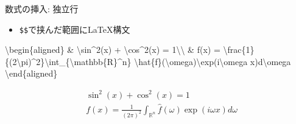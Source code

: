 \documentclass[
  14pt,
  ignorenonframetext,
]{beamer}
\newenvironment{Shaded}{\begin{snugshade}}{\end{snugshade}}
\newcommand{\SpecialCharTok}[1]{\textcolor[rgb]{0.00,0.00,0.00}{#1}}
\newcommand{\SpecialStringTok}[1]{\textcolor[rgb]{0.31,0.60,0.02}{#1}}
\providecommand{\tightlist}{%
  \setlength{\itemsep}{0pt}\setlength{\parskip}{0pt}}
\begin{document}
\begin{frame}[fragile]{数式の挿入: 独立行}
\protect\hypertarget{ux6570ux5f0fux306eux633fux5165-ux72ecux7acbux884c}{}

\begin{itemize}
\tightlist
\item
  \texttt{\$\$}で挟んだ範囲に\LaTeX 構文
\end{itemize}

\begin{Shaded}
\begin{Highlighting}[]
\SpecialStringTok{$$}\SpecialCharTok{\textbackslash{}begin}\SpecialStringTok{\{aligned\}}
\SpecialStringTok{& }\SpecialCharTok{\textbackslash{}sin}\SpecialStringTok{^2(x) + }\SpecialCharTok{\textbackslash{}cos}\SpecialStringTok{^2(x) = 1}\SpecialCharTok{\textbackslash{}\textbackslash{}}
\SpecialStringTok{& f(x) = }\SpecialCharTok{\textbackslash{}frac}\SpecialStringTok{\{1\}\{(2}\SpecialCharTok{\textbackslash{}pi}\SpecialStringTok{)^2\}}\SpecialCharTok{\textbackslash{}int}\SpecialStringTok{_\{}\SpecialCharTok{\textbackslash{}mathbb}\SpecialStringTok{\{R\}^n\}}
\SpecialCharTok{\textbackslash{}hat}\SpecialStringTok{\{f\}(}\SpecialCharTok{\textbackslash{}omega}\SpecialStringTok{)}\SpecialCharTok{\textbackslash{}exp}\SpecialStringTok{(i}\SpecialCharTok{\textbackslash{}omega}\SpecialStringTok{ x)d}\SpecialCharTok{\textbackslash{}omega}
\SpecialCharTok{\textbackslash{}end}\SpecialStringTok{\{aligned\}$$}
\end{Highlighting}
\end{Shaded}

\[\begin{aligned}
& \sin^2(x) + \cos^2(x) = 1\\
& f(x) = \frac{1}{(2\pi)^2}\int_{\mathbb{R}^n}\hat{f}(\omega)\exp(i\omega x)d\omega
\end{aligned}\]

\end{frame}
\end{document}
